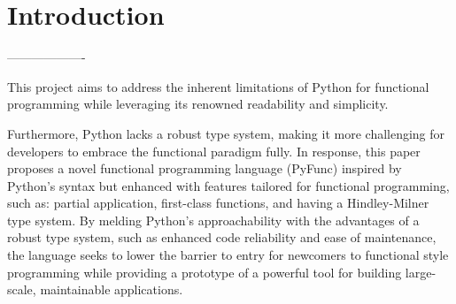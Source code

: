 \documentclass{l4proj}
\begin{document}
\chapter{Introduction}




\begin{center}
    -------------------
\end{center}




This project aims to address the inherent limitations of Python for functional programming while leveraging its renowned readability and simplicity.

Furthermore, Python lacks a robust type system, making it more challenging for developers to embrace the functional paradigm fully.
In response, this paper proposes a novel functional programming language (PyFunc) inspired by Python's syntax but enhanced with features tailored for functional programming, such as: partial application, first-class functions, and having a Hindley-Milner type system.
By melding Python's approachability with the advantages of a robust type system\citep{Hanenberg_Kleinschmager_Robbes_Tanter_Stefik_2013}, such as enhanced code reliability and ease of maintenance, the language seeks to lower the barrier to entry for newcomers to functional style programming while providing a prototype of a powerful tool for building large-scale, maintainable applications.
\end{document}
